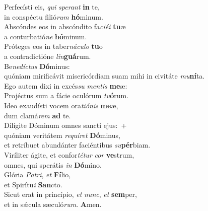 \evenverse Perfecísti eis, \textit{qui} \textit{spe}\textit{rant} \textbf{in} te,~\*\\
\evenverse in conspéctu filió\textit{rum} \textbf{hó}minum.\\
\oddverse Abscóndes eos in abscóndito fa\textit{ci}\textit{é}\textit{i} \textbf{tu}æ~\*\\
\oddverse a conturbatió\textit{ne} \textbf{hó}minum.\\
\evenverse Próteges eos in taber\textit{ná}\textit{cu}\textit{lo} \textbf{tu}o~\*\\
\evenverse a contradictióne \textit{lin}\textbf{guá}rum.\\
\oddverse Be\textit{ne}\textit{dí}\textit{ctus} \textbf{Dó}minus:~\*\\
\oddverse quóniam mirificávit misericórdiam suam mihi in civitáte \textit{mu}\textbf{ní}ta.\\
\evenverse Ego autem dixi in excés\textit{su} \textit{men}\textit{tis} \textbf{me}æ:~\*\\
\evenverse Projéctus sum a fácie oculórum \textit{tu}\textbf{ó}rum.\\
\oddverse Ideo exaudísti vocem ora\textit{ti}\textit{ó}\textit{nis} \textbf{me}æ,~\*\\
\oddverse dum clamá\textit{rem} \textbf{ad} te.\\
\evenverse Dilígite Dóminum omnes sancti ejus:~+\\
\evenverse  quóniam veritátem \textit{re}\textit{quí}\textit{ret} \textbf{Dó}minus,~\*\\
\evenverse et retríbuet abundánter faciéntibus \textit{su}\textbf{pér}biam.\\
\oddverse Viríliter ágite, et confor\textit{té}\textit{tur} \textit{cor} \textbf{ve}strum,~\*\\
\oddverse omnes, qui sperátis \textit{in} \textbf{Dó}mino.\\
\evenverse Glória \textit{Pa}\textit{tri}, \textit{et} \textbf{Fí}lio,~\*\\
\evenverse et Spirítu\textit{i} \textbf{San}cto.\\
\oddverse Sicut erat in princípio, \textit{et} \textit{nunc}, \textit{et} \textbf{sem}per,~\*\\
\oddverse et in sǽcula sæculó\textit{rum}. \textbf{A}men.\\
